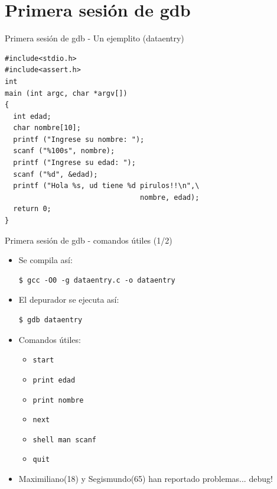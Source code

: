 \documentclass[xetex]{beamer}
\begin{document}
\section{Primera sesión de gdb}
\begin{frame}[fragile]{Primera sesión de gdb - Un ejemplito (dataentry)}
\begin{lstlisting}
#include<stdio.h>
#include<assert.h>
int
main (int argc, char *argv[])
{
  int edad;
  char nombre[10];
  printf ("Ingrese su nombre: ");
  scanf ("%100s", nombre);
  printf ("Ingrese su edad: ");
  scanf ("%d", &edad);
  printf ("Hola %s, ud tiene %d pirulos!!\n",\
                                nombre, edad);
  return 0;
}
\end{lstlisting}
\end{frame}

\begin{frame}[fragile]{Primera sesión de gdb - comandos útiles (1/2)}
\begin{itemize}
\item Se compila así:
\begin{verbatim}
$ gcc -O0 -g dataentry.c -o dataentry
\end{verbatim}

\item El depurador se ejecuta así: 
\begin{verbatim}
$ gdb dataentry
\end{verbatim}
\item Comandos útiles: 
    \begin{itemize}
        \item \verb=start=
        \item \verb=print edad=
        \item \verb=print nombre=
        \item \verb=next=
        \item \verb=shell man scanf=
        \item \verb=quit= 
    \end{itemize}
\item Maximiliano(18) y Segismundo(65) han reportado problemas... debug! 
\end{itemize}
\end{frame}
\end{document}
